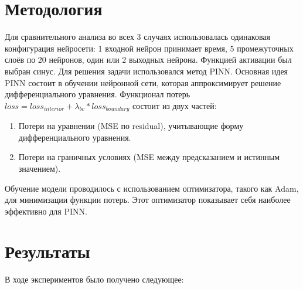 \documentclass[12pt,a4paper]{article}
\begin{document}
\section{Методология}

Для сравнительного анализа во всех 3 случаях использовалась одинаковая конфигурация нейросети: 1 входной нейрон принимает время, 5 промежуточных слоёв по 20 нейронов, один или 2 выходных нейрона. Функцией активации был выбран синус.
Для решения задачи использовался метод PINN. Основная идея PINN состоит в обучении нейронной сети, которая аппроксимирует решение дифференциального уравнения. Функционал потерь $loss = loss_{interior} + \lambda_{bc} * loss_{boundary}$ состоит из двух частей:
\begin{enumerate}
    \item Потери на уравнении (MSE по residual), учитывающие форму дифференциального уравнения.
    \item Потери на граничных условиях (MSE между предсказанием и истинным значением).
\end{enumerate}

Обучение модели проводилось с использованием оптимизатора, такого как Adam, для минимизации функции потерь. Этот оптимизатор показывает себя наиболее эффективно для PINN.
\section{Результаты}
В ходе экспериментов было получено следующее:
\end{document}
